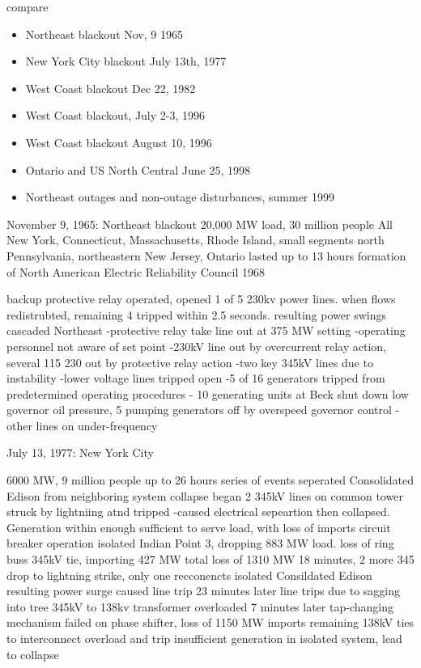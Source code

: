compare
\begin{itemize}
\item Northeast blackout Nov, 9 1965
\item New York City blackout July 13th, 1977
\item West Coast blackout Dec 22, 1982
\item West Coast blackout, July 2-3, 1996
\item West Coast blackout August 10, 1996
\item Ontario and US North Central June 25, 1998
\item Northeast outages and non-outage disturbances, summer 1999
\end{itemize}

November 9, 1965: Northeast blackout
20,000 MW load, 30 million people
All New York, Connecticut, Massachusetts, Rhode Island, small segments north Pennsylvania, northeastern New Jersey, Ontario
lasted up to 13 hours
formation of North American Electric Reliability Council 1968

backup protective relay operated, opened 1 of 5 230kv power lines.  when flows redistrubted, remaining 4 tripped within 2.5 seconds.  resulting power swings cascaded Northeast
-protective relay take line out at 375 MW setting
-operating personnel not aware of set point
-230kV line out by overcurrent relay action, several 115 230 out by protective relay action
-two key 345kV lines due to instability 
-lower voltage lines tripped open
-5 of 16 generators tripped from predetermined operating procedures
- 10 generating units at Beck shut down low governor oil pressure, 5 pumping generators off by overspeed governor control
-other lines on under-frequency

July 13, 1977: New York City

6000 MW, 9 million people
up to 26 hours
series of events seperated Consolidated Edison from neighboring system
collapse began 2 345kV lines on common tower struck by lightniing atnd tripped
-caused electrical sepeartion then collapsed.  
Generation within enough sufficient to serve load, with loss of imports
circuit breaker operation isolated Indian Point 3, dropping 883 MW load.  loss of ring buss 345kV tie, importing 427 MW
total loss of 1310 MW
18 minutes, 2 more 345 drop to lightning strike, only one recconencts
isolated Consildated Edison
resulting power surge caused line trip
23 minutes later line trips due to sagging into tree
345kV to 138kv transformer overloaded
7 minutes later tap-changing mechanism failed on phase shifter, loss of 1150 MW imports
remaining 138kV ties to interconnect overload and trip
insufficient generation in isolated system, lead to collapse

